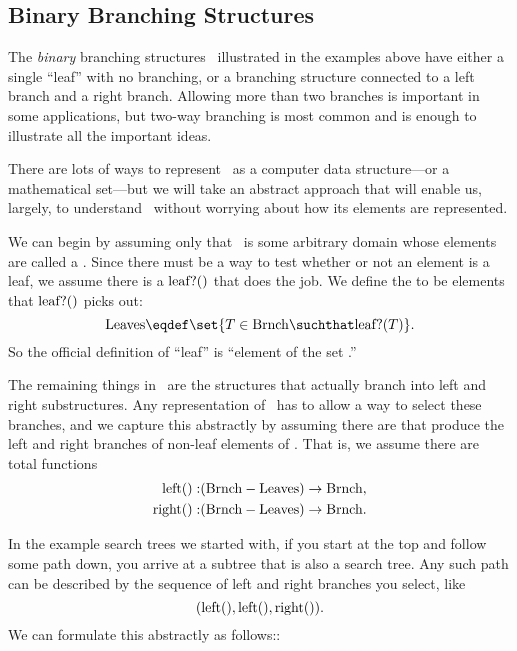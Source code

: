 \subsection{Binary Branching Structures}

The \emph{binary} branching structures \brnch\ illustrated in the
examples above have either a single ``leaf'' with no branching, or a
branching structure connected to a left branch and a right branch.
Allowing more than two branches is important in some applications, but
two-way branching is most common and is enough to illustrate all the
important ideas.

There are lots of ways to represent \brnch\ as a computer data
structure---or a mathematical set---but we will take an abstract
approach that will enable us, largely, to understand \brnch\ without
worrying about how its elements are represented.

We can begin by assuming only that \brnch\ is some arbitrary domain
whose elements are called a .  Since
there must be a way to test whether or not an element is a leaf, we
assume there is a  $\text{leaf?}()$ that does the job.
We define the  to be elements that $\text{leaf?}()$ picks out:
\[
\leafset \eqdef \set{T \in \brnch \suchthat \leafp{T}}.
\]
So the official definition of ``leaf'' is ``element of the set \leafset.''

The remaining things in \brnch\ are the structures that actually
branch into left and right substructures.  Any representation of
\brnch\ has to allow a way to select these branches, and we capture
this abstractly by assuming there are  that
produce the left and right branches of non-leaf elements of \brnch.
That is, we assume there are total functions
\begin{align*}
\text{left}(): & (\text{Brnch} - \text{Leaves}) \to \text{Brnch},\\
\text{right}():& (\text{Brnch} - \text{Leaves}) \to \text{Brnch}.
\end{align*}

In the example search trees we started with, if you start at the top and
follow some path down, you arrive at a subtree that is also a search
tree.  Any such path can be described by the sequence of left and
right branches you select, like
\[
(\text{left}(),\text{left}(),\text{right}()).
\]
We can formulate this abstractly as follows::

